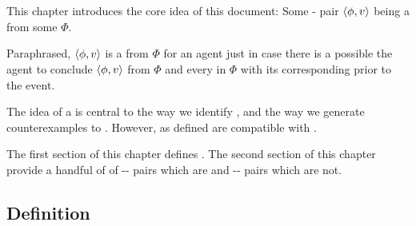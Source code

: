\chapter{}
\label{cha:fcs}

\nocite{Ryle:1946tu}



\begin{note}
  This chapter introduces the core idea of this document:
  Some - pair \(\langle\phi, v\rangle\) being a \emph{\fc{}} from some  \(\Phi\).

  Paraphrased, \(\langle\phi, v\rangle\) is a \fc{} from \(\Phi\) for an agent just in case there is a possible  the agent to conclude \(\langle\phi, v\rangle\) from \(\Phi\) and \evals{} every \prop{} in \(\Phi\) with its corresponding \val{} prior to the event.
\end{note}

\begin{note}
  The idea of a  is central to the way we identify , and the way we generate counterexamples to \issueInclusion{}.
  However,  as defined are compatible with \issueInclusion{}.
\end{note}

\begin{note}
  The first section of this chapter defines .
  The second section of this chapter provide a handful of  of -- pairs which are  and -- pairs which are not.
\end{note}

\section{Definition}
\label{cha:fcs:def}

